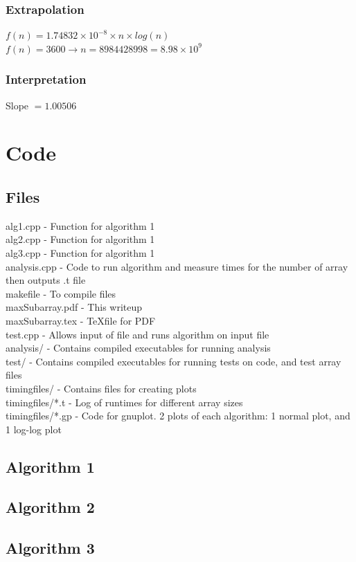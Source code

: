 \documentclass[a4paper,10pt]{article}
\begin{document}
			\subsubsection{Extrapolation}
				$f(n) = 1.74832 \times 10^{-8} \times n \times log(n)$\\
				$f(n) = 3600 \to n = 8984428998 = \boxed{8.98 \times 10^9}$
			\subsubsection{Interpretation}
				Slope $= \boxed{1.00506}$

	\newpage
	\section{Code}
		\subsection{Files}
			alg1.cpp - Function for algorithm 1\\
			alg2.cpp - Function for algorithm 1\\
			alg3.cpp - Function for algorithm 1\\
			analysis.cpp - Code to run algorithm and measure times for the number of array then outputs .t file\\
			makefile - To compile files\\
			maxSubarray.pdf - This writeup\\
			maxSubarray.tex - \TeX file for PDF\\
			test.cpp - Allows input of file and runs algorithm on input file\\
			analysis/ - Contains compiled executables for running analysis\\
			test/ - Contains compiled executables for running tests on code, and test array files\\
			timingfiles/ - Contains files for creating plots\\
			timingfiles/*.t - Log of runtimes for different array sizes\\
			timingfiles/*.gp - Code for gnuplot. 2 plots of each algorithm: 1 normal plot, and 1 log-log plot

		\subsection{Algorithm 1}
		
		\newpage
		\subsection{Algorithm 2}
		
		\newpage
		\subsection{Algorithm 3}
		
		
\end{document}
